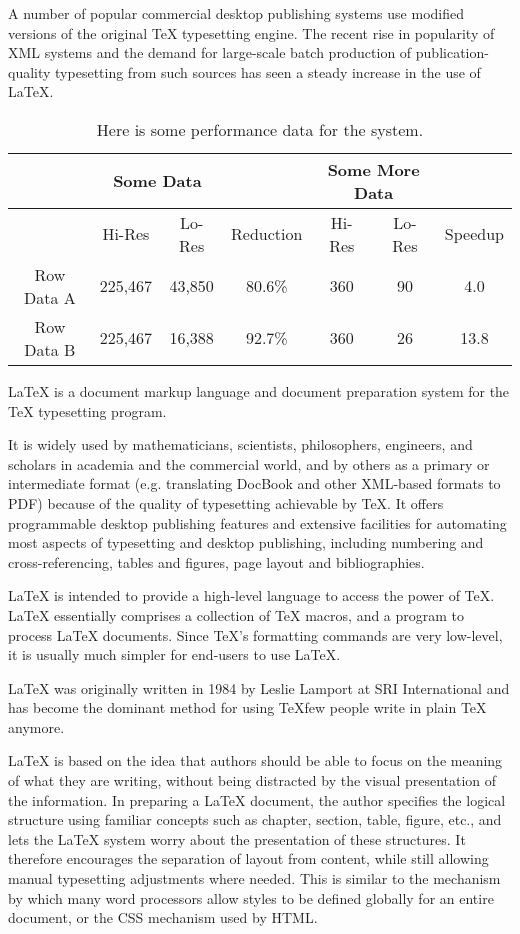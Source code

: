 A number of popular commercial desktop publishing systems use modified versions of the original TeX typesetting engine. The recent rise in popularity of XML systems and the demand for large-scale batch production of publication-quality typesetting from such sources has seen a steady increase in the use of LaTeX.


\begin{table}
\begin{center}

\begin{tabular}{|c|c|c|c|c|c|c|}
\hline 
&
\multicolumn{2}{c|}{Some Data}&
&
\multicolumn{2}{c|}{Some More Data}&
\tabularnewline
\hline
\hline 
&  Hi-Res&  Lo-Res&  Reduction&  Hi-Res&  Lo-Res&  Speedup
\tabularnewline
\hline 
Row Data A &  225,467&  43,850&  80.6\%&  360&  90&  4.0
\tabularnewline
\hline 
Row Data B &  225,467&  16,388&  92.7\%&  360&  26&  13.8
\tabularnewline
\hline 
\end{tabular}


\captionfonts
\caption[Performance data]{Here is some performance data for the system.}
\label{table:performance}
\end{center}
\end{table}


LaTeX is a document markup language and document preparation system for the TeX typesetting program.

It is widely used by mathematicians, scientists, philosophers, engineers, and scholars in academia and the commercial world, and by others as a primary or intermediate format (e.g. translating DocBook and other XML-based formats to PDF) because of the quality of typesetting achievable by TeX. It offers programmable desktop publishing features and extensive facilities for automating most aspects of typesetting and desktop publishing, including numbering and cross-referencing, tables and figures, page layout and bibliographies.

LaTeX is intended to provide a high-level language to access the power of TeX. LaTeX essentially comprises a collection of TeX macros, and a program to process LaTeX documents. Since TeX's formatting commands are very low-level, it is usually much simpler for end-users to use LaTeX.

LaTeX was originally written in 1984 by Leslie Lamport at SRI International and has become the dominant method for using TeXfew people write in plain TeX anymore.

LaTeX is based on the idea that authors should be able to focus on the meaning of what they are writing, without being distracted by the visual presentation of the information. In preparing a LaTeX document, the author specifies the logical structure using familiar concepts such as chapter, section, table, figure, etc., and lets the LaTeX system worry about the presentation of these structures. It therefore encourages the separation of layout from content, while still allowing manual typesetting adjustments where needed. This is similar to the mechanism by which many word processors allow styles to be defined globally for an entire document, or the CSS mechanism used by HTML.

